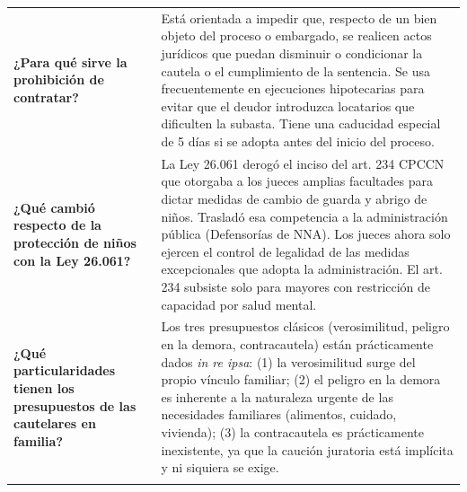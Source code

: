\documentclass[12pt,oneside]{book}
\begin{document}
\begin{longtable}{p{} p{}}
\textbf{¿Para qué sirve la prohibición de contratar?} &
Está orientada a impedir que, respecto de un bien objeto del proceso o embargado, se realicen actos jurídicos que puedan disminuir o condicionar la cautela o el cumplimiento de la sentencia. Se usa frecuentemente en ejecuciones hipotecarias para evitar que el deudor introduzca locatarios que dificulten la subasta. Tiene una caducidad especial de 5 días si se adopta antes del inicio del proceso. \\
\addlinespace

\textbf{¿Qué cambió respecto de la protección de niños con la Ley 26.061?} &
La Ley 26.061 derogó el inciso del art. 234 CPCCN que otorgaba a los jueces amplias facultades para dictar medidas de cambio de guarda y abrigo de niños. Trasladó esa competencia a la administración pública (Defensorías de NNA). Los jueces ahora solo ejercen el control de legalidad de las medidas excepcionales que adopta la administración. El art. 234 subsiste solo para mayores con restricción de capacidad por salud mental. \\
\addlinespace

\textbf{¿Qué particularidades tienen los presupuestos de las cautelares en familia?} &
Los tres presupuestos clásicos (verosimilitud, peligro en la demora, contracautela) están prácticamente dados \textit{in re ipsa}: (1) la verosimilitud surge del propio vínculo familiar; (2) el peligro en la demora es inherente a la naturaleza urgente de las necesidades familiares (alimentos, cuidado, vivienda); (3) la contracautela es prácticamente inexistente, ya que la caución juratoria está implícita y ni siquiera se exige. \\
\addlinespace


\end{longtable}
\end{document}
